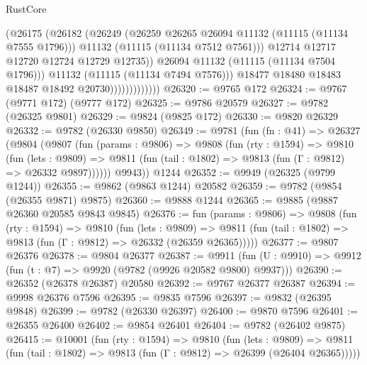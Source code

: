 \begin{lexlean}{RustCore}
\begin{coremodule}
                                  (@26175
                                    (@26182
                                      (@26249
                                        (@26259 @26265 @26094 @11132 (@11115 (@11134 @7555 @1796)))
                                        @11132
                                        (@11115 (@11134 @7512 @7561)))
                                      @12714
                                      @12717
                                      @12720
                                      @12724
                                      @12729
                                      @12735))
                                  @26094
                                  @11132
                                  (@11115 (@11134 @7504 @1796)))
                                @11132
                                (@11115 (@11134 @7494 @7576)))
                              @18477
                              @18480
                              @18483
                              @18487
                              @18492
                              @20730)))))))))))))
@26320 := @9765 @172
@26324 := @9767 (@9771 @172) (@9777 @172)
@26325 := @9786 @20579
@26327 := @9782 (@26325 @9801)
@26329 := @9824 (@9825 @172)
@26330 := @9820 @26329
@26332 := @9782 (@26330 @9850)
@26349 := @9781
    (fun (fn : @41) =>
    @26327
      (@9804
        (@9807
          (fun (params : @9806) =>
          @9808
            (fun (rty : @1594) =>
            @9810
              (fun (lets : @9809) =>
              @9811 (fun (tail : @1802) => @9813 (fun (Γ : @9812) => @26332 @9897))))))
        @9943))
    @1244
@26352 := @9949 (@26325 (@9799 @1244))
@26355 := @9862 (@9863 @1244) @20582
@26359 := @9782 (@9854 (@26355 @9871) @9875)
@26360 := @9888 @1244
@26365 := @9885 (@9887 @26360 @20585 @9843 @9845)
@26376 := fun (params : @9806) =>
  @9808
    (fun (rty : @1594) =>
    @9810
      (fun (lets : @9809) =>
      @9811 (fun (tail : @1802) => @9813 (fun (Γ : @9812) => @26332 (@26359 @26365)))))
@26377 := @9807 @26376
@26378 := @9804 @26377
@26387 := @9911
    (fun (U : @9910) => @9912 (fun (t : @7) => @9920 (@9782 (@9926 @20582 @9800) @9937)))
@26390 := @26352 (@26378 @26387) @20580
@26392 := @9767 @26377 @26387
@26394 := @9998 @26376 @7596
@26395 := @9835 @7596
@26397 := @9832 (@26395 @9848)
@26399 := @9782 (@26330 @26397)
@26400 := @9870 @7596
@26401 := @26355 @26400
@26402 := @9854 @26401
@26404 := @9782 (@26402 @9875)
@26415 := @10001
    (fun (rty : @1594) =>
    @9810
      (fun (lets : @9809) =>
      @9811 (fun (tail : @1802) => @9813 (fun (Γ : @9812) => @26399 (@26404 @26365)))))

\end{coremodule}
\end{lexlean}
